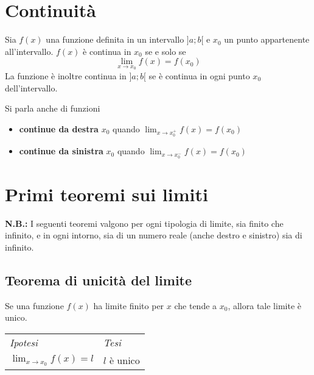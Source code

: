 \documentclass{book}     %
\begin{document}
\section{Continuità}
\begin{boxdef}
    Sia $f(x)$ una funzione definita in un intervallo $]a;b[$ e $x_0$ un punto appartenente all'intervallo. $f(x)$ è continua in $x_0$ se e solo se \[\lim_{x\to x_0}f(x)=f(x_0)\]
    La funzione è inoltre continua in $]a;b[$ se è continua in ogni punto $x_0$ dell'intervallo.
\end{boxdef}
Si parla anche di funzioni
\begin{itemize}
    \item \textbf{continue da destra} $x_0$ quando $\lim_{x\to x_0^+}f(x)=f(x_0)$
    \item \textbf{continue da sinistra} $x_0$ quando $\lim_{x\to x_0^-}f(x)=f(x_0)$
\end{itemize}
\section{Primi teoremi sui limiti}
\textbf{N.B.:} I seguenti teoremi valgono per ogni tipologia di limite, sia finito che infinito, e in ogni intorno, sia di un numero reale (anche destro e sinistro) sia di infinito.
    \subsection{Teorema di unicità del limite}
        \begin{shadedTheorem}
            Se una funzione $f(x)$ ha limite finito per $x$ che tende a $x_0$, allora tale limite è unico.
        \end{shadedTheorem}
        \begin{tabular}{m{}m{}}
            \textit{Ipotesi} & \textit{Tesi}  \\
            $\displaystyle\lim_{x\rightarrow x_0}f(x) = l$ & $l$ è unico
        \end{tabular}
        
\end{document}
